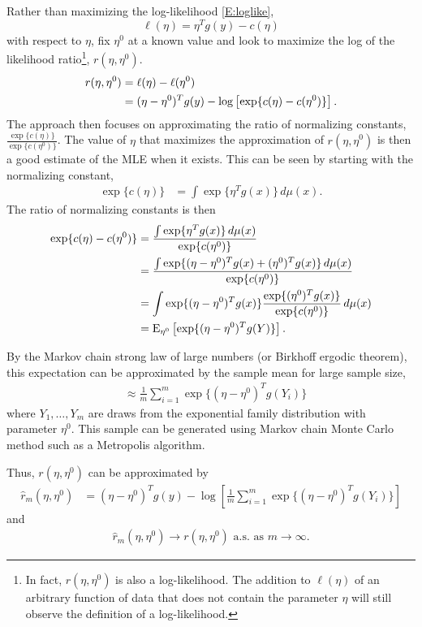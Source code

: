 Rather than maximizing the log-likelihood \eqref{E:loglike},
\[	\ell(\eta ) = \eta ^T g(y) - c(\eta) \]
with respect to $\eta$, \citeauthor{Geyer:1992} fix $\eta^0$ at a known value and look to maximize the log of the likelihood ratio\footnote{In fact, $r(\eta, \eta^0)$ is also a log-likelihood.  The addition to $\ell (\eta)$ of an arbitrary function of data that does not contain the parameter $\eta$ will still observe the definition of a log-likelihood.}, $r( \eta, \eta^0 )$.
\begin{align}
 r( \eta, \eta^0 ) &= \ell( \eta ) - \ell( \eta^0 ) \notag \\ 
					&= ( \eta - \eta^0)^T g(y) - \log \left [ \exp \{ c(\eta) - c(\eta^0) \} \right ]. \label{E:r}
\end{align}
The approach then focuses on approximating the ratio of normalizing constants, $\frac{ \exp \{c(\eta) \} }{ \exp \{c(\eta^0) \} }$.  The value of $\eta$ that maximizes the approximation of $r( \eta, \eta^0 )$ is then a good estimate of the MLE when it exists.  This can be seen by starting with the normalizing constant,
\begin{align*}
	\exp \{c(\eta) \} &= \int \exp\{\eta^Tg(x)\} \, d\mu(x).
\end{align*}
The ratio of normalizing constants is then
\begin{align*}
	\exp\{ c(\eta) - c(\eta^0) \} &= \frac{ \int \exp\{\eta^Tg(x)\} \, d\mu(x) }{ \exp\{ c(\eta^0) \} } \\
	&= \frac{ \int \exp\{( \eta - \eta^0)^T g(x) + (\eta^0)^Tg(x)\}\, d\mu(x)  }{ \exp\{ c(\eta^0) \} } \\
	&= \int \exp\{( \eta - \eta^0)^T g(x) \} \frac{ \exp \{(\eta^0)^T g(x)\} }{ \exp\{ c(\eta^0) \}  } \, d\mu(x)\\
	&= \operatorname{E}_{\eta^0} \left [ \exp\{ ( \eta - \eta^0)^T g(Y)  \} \right ].
\end{align*}

By the Markov chain strong law of large numbers (or Birkhoff ergodic theorem), this expectation can be approximated by the sample mean for large sample size,
\begin{align*}
	&\approx \frac{1}{m} \sum_{i=1}^{m}\exp \{ ( \eta - \eta^0)^Tg(Y_i) \}
\end{align*}
where $Y_1, \ldots, Y_m$ are draws from the exponential family distribution with parameter $\eta^0$.  This sample can be generated using Markov chain Monte Carlo method such as a Metropolis algorithm.

Thus, $r( \eta, \eta^0 )$ can be approximated by
\begin{align}
\hat{r}_m( \eta, \eta^0 ) &= ( \eta - \eta^0)^Tg(y) - \log \left [ \frac{1}{m} \sum_{i=1}^{m} \exp \{ ( \eta - \eta^0)^Tg(Y_i)\} \right ] \label{E:r_hat}
\end{align}
and 
\begin{align*}
	\hat{r}_m( \eta, \eta^0 ) \to r( \eta, \eta^0 ) \text{ a.s. as $m \to \infty$}.
\end{align*}

